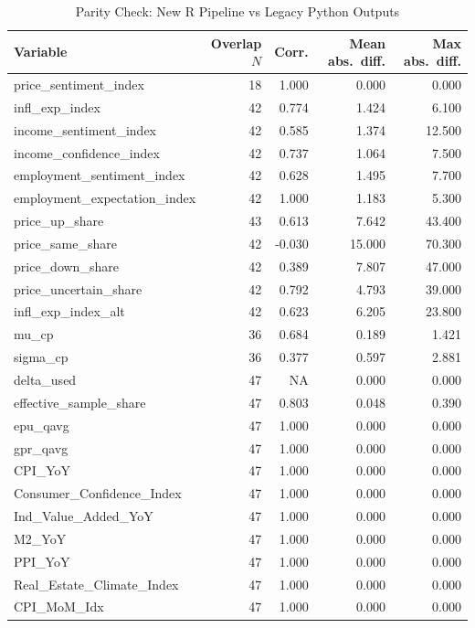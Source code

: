 \begin{table}[!htbp]
\centering
\small
\caption{Parity Check: New R Pipeline vs Legacy Python Outputs}
\label{tab:parity_check}
\begin{threeparttable}

\begin{tabular}{lrrrr}
\toprule
Variable & Overlap $N$ & Corr. & Mean abs.\ diff. & Max abs.\ diff. \\
\midrule
price\_sentiment\_index & 18 & 1.000 & 0.000 & 0.000\\
infl\_exp\_index & 42 & 0.774 & 1.424 & 6.100\\
income\_sentiment\_index & 42 & 0.585 & 1.374 & 12.500\\
income\_confidence\_index & 42 & 0.737 & 1.064 & 7.500\\
employment\_sentiment\_index & 42 & 0.628 & 1.495 & 7.700\\
\addlinespace
employment\_expectation\_index & 42 & 1.000 & 1.183 & 5.300\\
price\_up\_share & 43 & 0.613 & 7.642 & 43.400\\
price\_same\_share & 42 & -0.030 & 15.000 & 70.300\\
price\_down\_share & 42 & 0.389 & 7.807 & 47.000\\
price\_uncertain\_share & 42 & 0.792 & 4.793 & 39.000\\
\addlinespace
infl\_exp\_index\_alt & 42 & 0.623 & 6.205 & 23.800\\
mu\_cp & 36 & 0.684 & 0.189 & 1.421\\
sigma\_cp & 36 & 0.377 & 0.597 & 2.881\\
delta\_used & 47 & NA & 0.000 & 0.000\\
effective\_sample\_share & 47 & 0.803 & 0.048 & 0.390\\
\addlinespace
epu\_qavg & 47 & 1.000 & 0.000 & 0.000\\
gpr\_qavg & 47 & 1.000 & 0.000 & 0.000\\
CPI\_YoY & 47 & 1.000 & 0.000 & 0.000\\
Consumer\_Confidence\_Index & 47 & 1.000 & 0.000 & 0.000\\
Ind\_Value\_Added\_YoY & 47 & 1.000 & 0.000 & 0.000\\
\addlinespace
M2\_YoY & 47 & 1.000 & 0.000 & 0.000\\
PPI\_YoY & 47 & 1.000 & 0.000 & 0.000\\
Real\_Estate\_Climate\_Index & 47 & 1.000 & 0.000 & 0.000\\
CPI\_MoM\_Idx & 47 & 1.000 & 0.000 & 0.000\\

\end{tabular}
\end{threeparttable}
\end{table}
